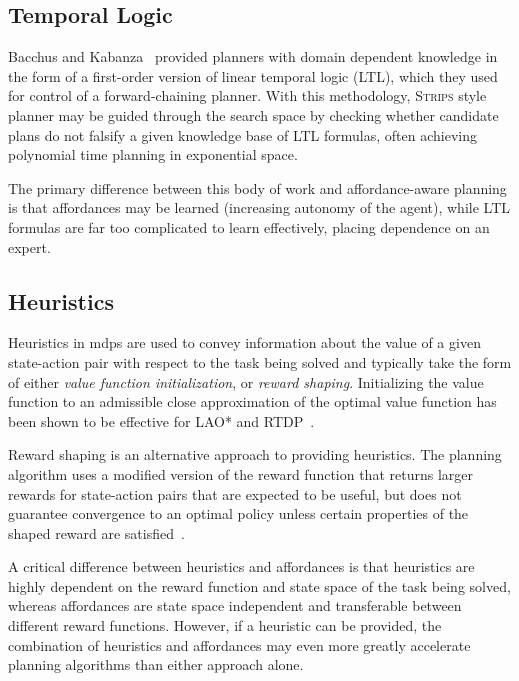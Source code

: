 \documentclass[letterpaper]{article}
\begin{document}
\subsection{Temporal Logic}

Bacchus and Kabanza~\cite{Bacchus95usingtemporal,Bacchus99usingtemporal} provided
planners with domain dependent knowledge in the form of a first-order version of linear
temporal logic (LTL), which they used for control of a forward-chaining planner. With this methodology, 
\textsc{Strips} style planner may be guided through the search space by checking 
whether candidate plans do not falsify a given knowledge base of LTL formulas, often
achieving polynomial time planning in exponential space.

The primary difference between this body of work and affordance-aware planning is that affordances may be learned (increasing autonomy of the agent), while LTL formulas are far too complicated to learn effectively, placing dependence on an expert.

\subsection{Heuristics}
Heuristics in \glspl{mdp} are used to convey information about the value of a given state-action pair with respect to the task being solved and typically take the form of either {\em value function initialization},
or {\em reward shaping}. Initializing the value function to an admissible close approximation of the optimal value function has been shown to be effective for LAO* and RTDP~\cite{Hansen:1999qf}.

Reward shaping is an alternative approach to providing heuristics. The planning algorithm uses a modified version of the reward function that returns larger rewards for state-action pairs that are expected to be useful, but does not guarantee convergence to an optimal policy unless certain properties of the shaped reward are satisfied~\cite{potshap}.

A critical difference between heuristics and affordances is that heuristics are highly dependent on the reward function and state space of the task being solved, whereas affordances are state space independent and transferable between different reward functions. However, if a heuristic can be provided, the combination of heuristics and affordances may even more greatly accelerate planning algorithms than either approach alone.
\end{document}
